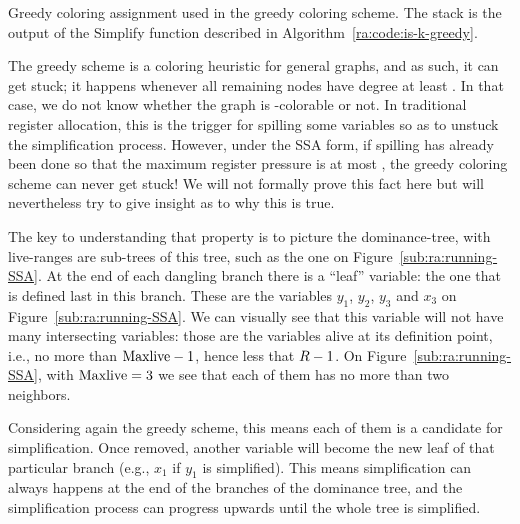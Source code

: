 {\begin{algorithm}[h]
\caption{Greedy coloring assignment used in the greedy coloring scheme. The stack is the output of the Simplify function described in Algorithm~\ref{ra:code:is-k-greedy}.}
\label{ra:code:assign-color}
\end{algorithm}



The greedy scheme is a coloring heuristic for general graphs, and as such, it can get stuck;
it happens whenever all remaining nodes have degree at least \regs.
In that case, we do not know whether the graph is \regs-colorable or not.
In traditional register allocation, this is the trigger for spilling some variables so as to unstuck the simplification process.
However, under the SSA form, if spilling has already been done so that the maximum register pressure is at most \regs, the greedy coloring scheme can never get stuck!
We will not formally prove this fact here but will nevertheless try to give insight as to why this is true.


The key to understanding that property is to picture the dominance-tree, with live-ranges are sub-trees of this tree, such as the one on Figure~\ref{sub:ra:running-SSA}.
At the end of each dangling branch there is a ``leaf'' variable: the one that is defined last in this branch.
These are the variables $y_1$, $y_2$, $y_3$ and $x_3$ on Figure~\ref{sub:ra:running-SSA}.
We can visually see that this variable will not have many intersecting variables:
those are the variables alive at its definition point, i.e., no more than $\mathrm{Maxlive}-1$, hence less that $R-1$.
On Figure~\ref{sub:ra:running-SSA}, with $\mathrm{Maxlive} = 3$ we see that each of them has no more than two neighbors.

Considering again the greedy scheme, this means each of them is a candidate for simplification.
Once removed, another variable will become the new leaf of that particular branch (e.g., $x_1$ if $y_1$ is simplified).
This means simplification can always happens at the end of the branches of the dominance tree, and the simplification process can progress upwards until the whole tree is simplified.

}
